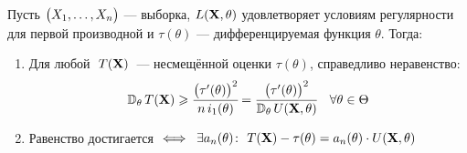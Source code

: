\begin{namedthm}
    Пусть $\bigl(X_1, \ldots, X_n \bigr)$ — выборка, $L(\mathbf{X}, \theta)$ удовлетворяет условиям регулярности для первой производной и $\tau(\theta)$  —  дифференцируемая функция $\theta$. Тогда:
    \begin{enumerate}
        \item Для любой $~T(\mathbf{X})$~--- несмещённой оценки $\tau(\theta)$, справедливо неравенство:
        \begin{gather*}
            \operatorname{\mathbb{D}_{\theta}} T(\mathbf{X}) \geqslant 
            \cfrac{\bigl( \tau'(\theta) \bigr)^2}{n \, i_1(\theta)} = 
            \cfrac{\bigl( \tau'(\theta) \bigr)^2}{\operatorname{\mathbb{D}_{\theta}} U(\mathbf{X}, \theta)}
            \quad \forall \theta \in \Theta
        \end{gather*}
        
        \item Равенство достигается $\iff \; \exists a_n(\theta)\colon ~ T(\mathbf{X})-\tau(\theta)=a_{n}(\theta) \cdot U(\mathbf{X}, \theta)$
    \end{enumerate}
\end{namedthm}

